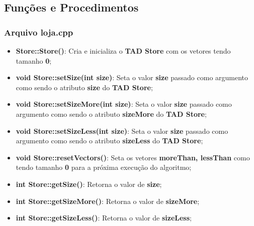 \documentclass[12pt]{article}
\begin{document}
    \subsection{Funções e Procedimentos}
    \subsubsection{Arquivo loja.cpp}
    \begin{itemize}
    \item \textbf{Store::Store()}: Cria e inicializa o \textbf{TAD Store} com os vetores tendo tamanho \textbf{0};
    \item \textbf{void Store::setSize(int size)}: Seta o valor \textbf{size} passado como argumento como sendo o atributo \textbf{size} do \textbf{TAD Store};
    \item \textbf{void Store::setSizeMore(int size)}: Seta o valor \textbf{size} passado como argumento como sendo o atributo \textbf{sizeMore} do \textbf{TAD Store};
    \item \textbf{void Store::setSizeLess(int size)}: Seta o valor \textbf{size} passado como argumento como sendo o atributo \textbf{sizeLess} do \textbf{TAD Store};
    \item \textbf{void Store::resetVectors()}: Seta os vetores \textbf{moreThan, lessThan} como tendo tamanho \textbf{0} para a próxima execução do algoritmo;
    \item \textbf{int Store::getSize()}: Retorna o valor de \textbf{size};
    \item \textbf{int Store::getSizeMore()}: Retorna o valor de \textbf{sizeMore};
    \item \textbf{int Store::getSizeLess()}: Retorna o valor de \textbf{sizeLess};
    

\end{itemize}
\end{document}
